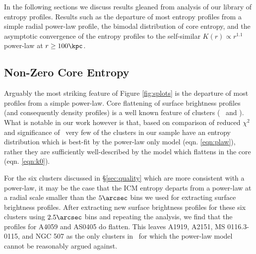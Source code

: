 \documentclass[apj]{emulateapj}
\begin{document}
In the following sections we discuss results gleaned from analysis of
our library of entropy profiles. Results such as the departure of most
entropy profiles from a simple radial power-law profile, the bimodal
distribution of core entropy, and the asymptotic convergence of the
entropy profiles to the self-similar $K(r) \propto r^{1.1}$ power-law
at $r \geq 100\kpc$.

\subsection{Non-Zero Core Entropy}
\label{sec:nonzerok0}

Arguably the most striking feature of Figure \ref{fig:splots} is the
departure of most profiles from a simple power-law. Core flattening of
surface brightness profiles (and consequently density profiles) is a
well known feature of clusters (\eg\ \citealt{1999ApJ...517..627M} and
\citealt{2000MNRAS.318..715X}). What is notable in our work however is
that, based on comparison of reduced $\chi^2$ and significance of
\kna\, very few of the clusters in our sample have an entropy
distribution which is best-fit by the power-law only model
(eqn. \ref{eqn:plaw}), rather they are sufficiently well-described by
the model which flattens in the core (eqn. \ref{eqn:k0}).

For the six clusters discussed in \S\ref{sec:quality} which are more
consistent with a power-law, it may be the case that the ICM entropy
departs from a power-law at a radial scale smaller than the $5\arcsec$
bins we used for extracting surface brightness profiles. After
extracting new surface brightness profiles for these six clusters
using $2.5\arcsec$ bins and repeating the analysis, we find that the
profiles for A4059 and AS0405 do flatten. This leaves A1919, A2151, MS
0116.3-0115, and NGC 507 as the only clusters in \accept\ for which
the power-law model cannot be reasonably argued against.
\end{document}
